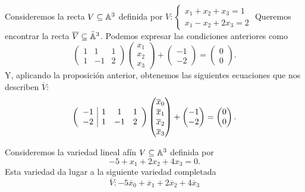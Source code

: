  \begin{example}
  Consideremos la recta $V \subseteq \mathbb{A}^3$ definida por $V:
  \begin{cases}
    x_1+x_2+x_3 = 1\\
    x_1-x_2+2x_3 = 2
  \end{cases}
  $
  Queremos encontrar la recta $\overline{V} \subseteq \bar{\mathbb{A}}^3$. Podemos
  expresar las condiciones anteriores como
  \[
    \begin{pmatrix}
      1 & 1 & 1 \\
      1 & -1 & 2 
    \end{pmatrix}
   \begin{pmatrix} x_1 \\ x_2 \\ x_3 \end{pmatrix} 
   + 
   \begin{pmatrix}
     -1 \\ -2
   \end{pmatrix}
   =
   \begin{pmatrix}
     0 \\ 0
   \end{pmatrix}.
 \]
Y, aplicando la proposición anterior, obtenemos las siguientes ecuaciones que nos
describen $\overline{V}$:
\[
  \left(
  \begin{array}{c|ccc}
      -1 & 1 & 1 & 1 \\
      -2 & 1 & -1 & 2 
    \end{array}
    \right)
    \begin{pmatrix} \overline{x}_0 \\ \overline{x}_1 \\ \overline{x}_2 \\ 
      \overline{x}_3 \end{pmatrix} 
   + 
   \begin{pmatrix}
     -1 \\ -2
   \end{pmatrix}
   =
   \begin{pmatrix}
     0 \\ 0
   \end{pmatrix}.
 \]
 \end{example}
 \begin{example}
   Consideremos la variedad lineal afín $V \subseteq \mathbb{A}^3$ definida por
   \[-5 + x_1 + 2x_2 + 4x_3 = 0.\]
   Esta variedad da lugar a la siguiente variedad completada
   \[
     \overline{V}\colon -5\overline{x}_0 + \overline{x}_1 + 2\overline{x}_2 + 
   4\overline{x}_3
 \]
 \end{example}

